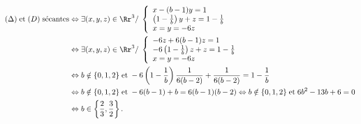 {{\begin{align*}\ensuremath
(\Delta)\;\text{et}\;(D)\;\text{sécantes}&\Leftrightarrow\exists(x,y,z)\in\Rr^3/\;\left\{
\begin{array}{l}
x-(b-1)y=1\\
\left(1-\frac{1}{b}\right)y+z=1-\frac{1}{b}\\
x=y=-6z
\end{array}
\right.\\
&\Leftrightarrow\exists(x,y,z)\in\Rr^3/\;\left\{
\begin{array}{l}
-6z+6(b-1)z=1\\
-6\left(1-\frac{1}{b}\right)z+z=1-\frac{1}{b}\\
x=y=-6z
\end{array}
\right.\\
 &\Leftrightarrow b\notin\{0,1,2\}\;\text{et}\;-6\left(1-\frac{1}{b}\right)\frac{1}{6(b-2)}+\frac{1}{6(b-2)}=1-\frac{1}{b}\\
 &\Leftrightarrow b\notin\{0,1,2\}\;\text{et}\;-6(b-1)+b=6(b-1)(b-2)\Leftrightarrow b\notin\{0,1,2\}\;\text{et}\;6b^2-13b+6=0\\
 &\Leftrightarrow b\in\left\{\frac{2}{3},\frac{3}{2}\right\}.
\end{align*}

\begin{center}
\end{center}
}
}
